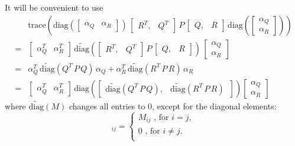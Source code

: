 \documentclass[EPiC]{easychair}
\renewcommand{\^}[1]{^{(#1)}}
\begin{document}
 It will be convenient to use
\begin{equation} \label{eq:factoringOutQuadratic}
\begin{split}
 & \mathrm{trace}\left(\mathrm{diag}(\begin{bmatrix} \alpha_Q & \alpha_R \end{bmatrix}) \, \begin{bmatrix} R^T, & Q^T \end{bmatrix} \, P \, \begin{bmatrix} Q, & R \end{bmatrix} \, \mathrm{diag}\left(\begin{bmatrix} \alpha_Q \\ \alpha_R \end{bmatrix}\right)\right) \\
 = & \begin{bmatrix} \alpha_Q^T & \alpha_R^T \end{bmatrix} \, \widetilde{\mathrm{diag}}\left(\begin{bmatrix} R^T, & Q^T \end{bmatrix} \, P \, \begin{bmatrix} Q, & R \end{bmatrix}\right)\, \begin{bmatrix} \alpha_Q \\ \alpha_R \end{bmatrix} \\
 = & \alpha_Q^T \, \widetilde{\mathrm{diag}}(Q^T \, P \, Q)\, \alpha_Q + 
 \alpha_R^T \, \widetilde{\mathrm{diag}}(R^T \, P \, R)\, \alpha_R \\
 = & \begin{bmatrix} \alpha_Q^T & \alpha_R^T \end{bmatrix} \, \mathrm{diag}\left(\begin{bmatrix} \widetilde{\mathrm{diag}}(Q^T \, P \, Q), & 
 \widetilde{\mathrm{diag}}(R^T \, P \, R)\,\end{bmatrix} \right) \begin{bmatrix} \alpha_Q \\ \alpha_R \end{bmatrix}
\end{split}
\end{equation}
where $\widetilde{\mathrm{diag}}(M)$ changes all entries to $0$, except for the diagonal elements:
\begin{equation*}
 [\widetilde{\mathrm{diag}}(M)]_{ij} = \begin{cases}
                             M_{ij} \text{ , for } i=j, \\
                             0 \text{ , for } i\neq j. \\
                            \end{cases}
\end{equation*}
\end{document}
